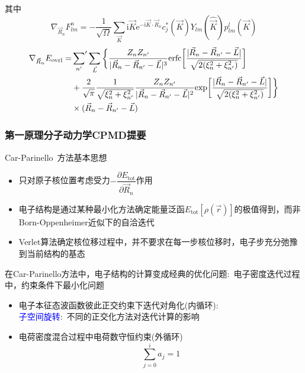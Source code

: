 {{\begin{itemize}
{{\begin{itemize}
{{\begin{displaymath}
\end{displaymath}
				}}
			\end{itemize}
			其中
			\begin{displaymath}
				\nabla_{\vec R_n}F_{lm}^n=-\dfrac1{\sqrt{\Omega}}\sum_{\vec K}\mathrm{i}\vec K\mathrm{e}^{-\mathrm{i}\vec K\cdot\vec R_n}c_j^{\ast}(\vec K)Y_{lm}(\hat{\vec K})p_{lm}^l(\vec K)
			\end{displaymath}
			\begin{displaymath}
				\begin{aligned}
					\nabla_{\vec R_n}E_{\mathrm{ovrl}}=&\sideset{}{^{\prime}}\sum_{n^{\prime}}\sum_{\vec L}\bigg\{\dfrac{Z_nZ_{n^{\prime}}}{|\vec R_n-\vec R_{n^{\prime}}-\vec L|^3}\mathrm{erfc}\bigg[\dfrac{|\vec R_n-\vec R_{n^{\prime}}-\vec L|}{\sqrt{2(\xi_n^2+\xi_{n^{\prime}}^2)}}\bigg]\\
					&+\dfrac2{\sqrt{\pi}}\dfrac1{\sqrt{\xi_n^2+\xi_{n^{\prime}}^2}}\dfrac{Z_nZ_{n^{\prime}}}{|\vec R_n-\vec R_{n^{\prime}}-\vec L|^2}\mathrm{exp}\bigg[\dfrac{|\vec R_n-\vec R_{n^{\prime}}-\vec L|}{\sqrt{2(\xi_n^2+\xi_{n^{\prime}}^2)}}\bigg]\bigg\}\\
					&\times(\vec R_n-\vec R_{n^{\prime}}-\vec L)
				\end{aligned}
			\end{displaymath}
		}}
	\end{itemize}

}

\frame
{
	\frametitle{第一原理分子动力学\textrm{CPMD}提要}
	\textrm{Car-Parinello~}方法基本思想
	\begin{itemize}
		\item 只对原子核位置考虑受力$-\dfrac{\partial E_{\mathrm{tot}}}{\partial\vec R_n}$作用
		\item 电子结构是通过某种最小化方法确定能量泛函$E_{\mathrm{tot}}[\rho(\vec r)]$的极值得到，而非\textrm{Born-Oppenheimer}近似下的自洽迭代
		\item \textrm{Verlet}算法确定核位移过程中，并不要求在每一步核位移时，电子步充分弛豫到当前结构的基态
	\end{itemize}
	在\textrm{Car-Parinello}方法中，电子结构的计算变成经典的优化问题:~电子密度迭代过程中，约束条件下最小化问题
	\begin{itemize}
		\item 电子本征态波函数彼此正交约束下迭代对角化(内循环):\\
			\textcolor{blue}{子空间旋转}:~不同的正交化方法对迭代计算的影响
		\item 电荷密度混合过程中电荷数守恒约束(外循环)
			\begin{displaymath}
				\sum\limits_{j=0}^i a_j=1
			\end{displaymath}
	\end{itemize}
}

}
